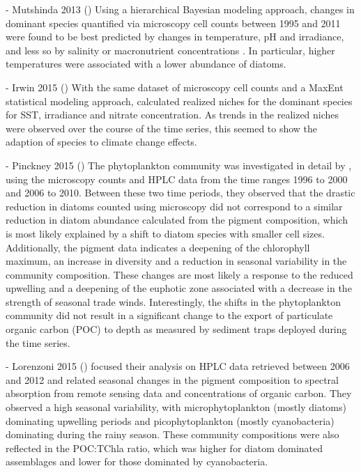     - Mutshinda 2013 ()
    Using a hierarchical Bayesian modeling approach, changes in dominant species quantified via microscopy cell counts between 1995 and 2011 were found to be best predicted by changes in temperature, pH and irradiance, and less so by salinity or macronutrient concentrations \cite{mutshinda_environmental_2013}. In particular, higher temperatures were associated with a lower abundance of diatoms. 
    
    - Irwin 2015 ()
    With the same dataset of microscopy cell counts and a MaxEnt statistical modeling approach,  calculated realized niches for the dominant species for SST, irradiance and nitrate concentration. As trends in the realized niches were observed over the course of the time series, this seemed to show the adaption of species to climate change effects. 
    
    - Pinckney 2015 ()
    The phytoplankton community was investigated in detail by , using the microscopy counts and HPLC data from the time ranges 1996 to 2000 and 2006 to 2010. Between these two time periods, they observed that the drastic reduction in diatoms counted using microscopy did not correspond to a similar reduction in diatom abundance calculated from the pigment composition, which is most likely explained by a shift to diatom species with smaller cell sizes. Additionally, the pigment data indicates a deepening of the chlorophyll maximum, an increase in diversity and a reduction in seasonal variability in the community composition. These changes are most likely a response to the reduced upwelling  and a deepening of the euphotic zone associated with a decrease in the strength of seasonal trade winds. Interestingly, the shifts in the phytoplankton community did not result in a significant change to the export of particulate organic carbon (POC) to depth as measured by sediment traps deployed during the time series. 

    - Lorenzoni 2015 ()
     focused their analysis on HPLC data retrieved between 2006 and 2012 and related seasonal changes in the pigment composition to spectral absorption from remote sensing data and concentrations of organic carbon. They observed a high seasonal variability, with microphytoplankton (mostly diatoms) dominating upwelling periods and picophytoplankton (mostly cyanobacteria) dominating during the rainy season. These community compositions were also reflected in the POC:TChla ratio, which was higher for diatom dominated assemblages and lower for those dominated by cyanobacteria. 
    

